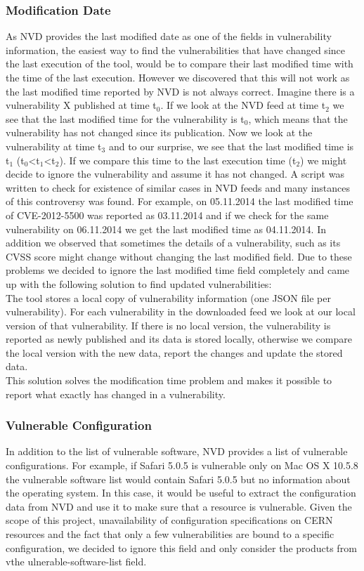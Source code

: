 \subsubsection{Modification Date}
As NVD provides the last modified date as one of the fields in vulnerability information, the easiest way to find the vulnerabilities that have changed since the last execution of the tool, would be to compare their last modified time with the time of the last execution. However we discovered that this will not work as the last modified time reported by NVD is not always correct. Imagine there is a vulnerability X published at time t$_{\text{0}}$. If we look at the NVD feed at time t$_{\text{2}}$ we see that the last modified time for the vulnerability is t$_{\text{0}}$, which means that the vulnerability has not changed since its publication. Now we look at the vulnerability at time t$_{\text{3}}$ and to our surprise, we see that the last modified time is t$_{\text{1}}$  (t$_{\text{0}}$<t$_{\text{1}}$<t$_{\text{2}}$). If we compare this time to the last execution time (t$_{\text{2}}$) we might decide to ignore the vulnerability and assume it has not changed. A script was written to check for existence of similar cases in NVD feeds and many instances of this controversy was found. For example, on 05.11.2014 the last modified time of CVE-2012-5500 was reported as 03.11.2014 and if we check for the same vulnerability on 06.11.2014 we get the last modified time as 04.11.2014. In addition we observed that sometimes the details of a vulnerability, such as its CVSS score might change without changing the last modified field. Due to these problems we decided to ignore the last modified time field completely and came up with the following solution to find updated vulnerabilities:
\\ 
The tool stores a local copy of vulnerability information (one JSON file per vulnerability). For each vulnerability in the downloaded feed we look at our local version of that vulnerability. If there is no local version, the vulnerability is reported as newly published and its data is stored locally, otherwise we compare the local version with the new data, report the changes and update the stored data.
\\ 
This solution solves the modification time problem and makes it possible to report what exactly has changed in a vulnerability. 

\subsubsection{Vulnerable Configuration}
In addition to the list of vulnerable software, NVD provides a list of vulnerable configurations. For example, if Safari 5.0.5 is vulnerable only on Mac OS X 10.5.8 the vulnerable software list would contain Safari 5.0.5 but no information about the operating system. In this case, it would be useful to extract the configuration data from NVD and use it to make sure that a resource is vulnerable. Given the scope of this project, unavailability of configuration specifications on CERN resources and the fact that only a few vulnerabilities are bound to a specific configuration, we decided to ignore this field and only consider the products from vthe ulnerable-software-list field. 

